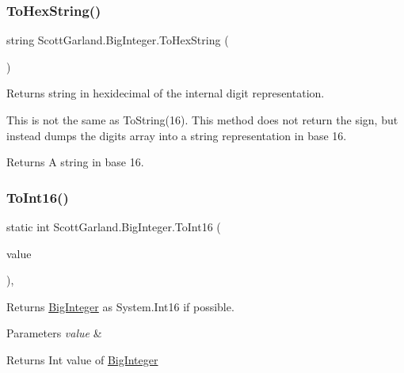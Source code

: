 \subsubsection{\texorpdfstring{To\+Hex\+String()}{ToHexString()}}
{\footnotesize\ttfamily string Scott\+Garland.\+Big\+Integer.\+To\+Hex\+String (\begin{DoxyParamCaption}{ }\end{DoxyParamCaption})\hspace{0.3cm}{\ttfamily [inline]}}



Returns string in hexidecimal of the internal digit representation. 

This is not the same as To\+String(16). This method does not return the sign, but instead dumps the digits array into a string representation in base 16. 

\begin{DoxyReturn}{Returns}
A string in base 16.
\end{DoxyReturn}
\mbox{\label{class_scott_garland_1_1_big_integer_a282c756614e3530c7ca3db75122df382}} 
\subsubsection{\texorpdfstring{To\+Int16()}{ToInt16()}}
{\footnotesize\ttfamily static int Scott\+Garland.\+Big\+Integer.\+To\+Int16 (\begin{DoxyParamCaption}\item[{\hyperlink{class_scott_garland_1_1_big_integer}{Big\+Integer}}]{value }\end{DoxyParamCaption})\hspace{0.3cm}{\ttfamily [inline]}, {\ttfamily [static]}}



Returns \hyperlink{class_scott_garland_1_1_big_integer}{Big\+Integer} as System.\+Int16 if possible. 


\begin{DoxyParams}{Parameters}
{\em value} & \\
\hline
\end{DoxyParams}
\begin{DoxyReturn}{Returns}
Int value of \hyperlink{class_scott_garland_1_1_big_integer}{Big\+Integer}
\end{DoxyReturn}

